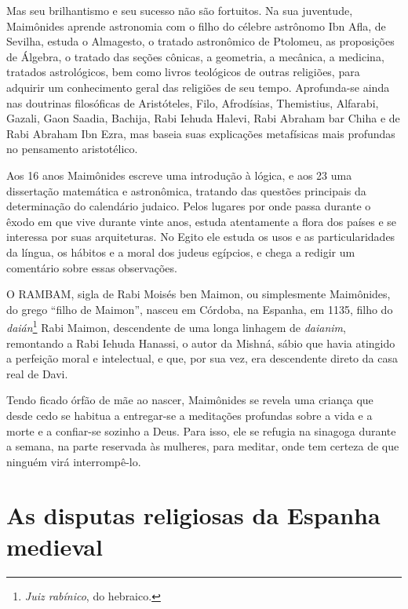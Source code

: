 Mas seu brilhantismo e seu sucesso não são fortuitos. Na sua juventude,
Maimônides aprende astronomia com o filho do célebre astrônomo Ibn
Afla, de Sevilha, estuda o Almagesto, o tratado astronômico de
Ptolomeu, as proposições de Álgebra, o tratado das seções cônicas, a
geometria, a mecânica, a medicina, tratados astrológicos, bem como
livros teológicos de outras religiões, para adquirir um conhecimento
geral das religiões de seu tempo. Aprofunda-se ainda nas doutrinas
filosóficas de Aristóteles, Filo, Afrodísias, Themistius, Alfarabi, Gazali, 
Gaon Saadia, Bachija, Rabi Iehuda Halevi, Rabi Abraham bar Chiha e de Rabi Abraham 
Ibn Ezra, mas baseia suas explicações metafísicas mais profundas no pensamento aristotélico.

Aos 16 anos Maimônides escreve uma introdução à lógica, e aos
23 uma dissertação matemática e astronômica, tratando das questões
principais da determinação do calendário judaico. Pelos lugares por onde
passa durante o êxodo em que vive durante vinte anos, estuda
atentamente a flora dos países e se interessa por suas arquiteturas. No
Egito ele estuda os usos e as particularidades da língua, os hábitos e
a moral dos judeus egípcios, e chega a redigir um comentário sobre essas
observações.

O RAMBAM, sigla de Rabi Moisés ben Maimon, ou simplesmente Maimônides,
do grego ``filho de Maimon'', nasceu em Córdoba, na Espanha, em 1135,
filho do \emph{daián}\footnote{\emph{Juiz rabínico}, do hebraico.} Rabi Maimon, 
descendente de uma longa linhagem de \emph{daianim}, remontando a Rabi Iehuda 
Hanassi, o autor da Mishná, sábio que havia atingido a perfeição moral e
intelectual, e que, por sua vez, era descendente direto da casa real de
Davi.

Tendo ficado órfão de mãe ao nascer, Maimônides se revela uma criança que
desde cedo se habitua a entregar-se a meditações profundas sobre a vida
e a morte e a confiar-se sozinho a Deus. Para isso, ele se refugia na
sinagoga durante a semana, na parte reservada às mulheres, para meditar,
onde tem certeza de que ninguém virá interrompê-lo.

\section{As disputas religiosas da Espanha medieval}

